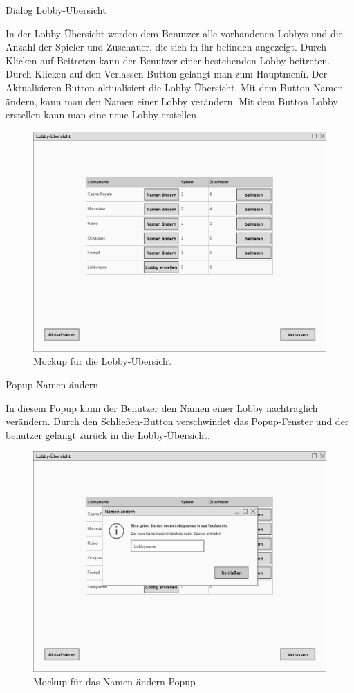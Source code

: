 Dialog \glqq{}Lobby-Übersicht\grqq{}

In der Lobby-Übersicht werden dem Benutzer alle vorhandenen Lobbys und die Anzahl der Spieler und Zuschauer, die sich in ihr befinden angezeigt. Durch Klicken auf Beitreten kann der Benutzer einer bestehenden Lobby beitreten. Durch Klicken auf den Verlassen-Button gelangt man zum Hauptmenü. Der Aktualisieren-Button aktualisiert die Lobby-Übersicht. Mit dem Button Namen ändern, kann man den Namen einer Lobby verändern. Mit dem Button Lobby erstellen kann man eine neue Lobby erstellen.

\begin{figure}
  \centering
  \includegraphics[width=\textwidth]{Meilenstein03/Lobby-Uebersicht_Mockup.png}
  \caption{Mockup für die Lobby-Übersicht}
\end{figure}

Popup \glqq{}Namen ändern\grqq{}

In diesem Popup kann der Benutzer den Namen einer Lobby nachträglich verändern. Durch den Schließen-Button verschwindet das Popup-Fenster und der benutzer gelangt zurück in die Lobby-Übersicht.

\begin{figure}
  \centering
  \includegraphics[width=\textwidth]{Meilenstein03/NamenAendern_Mockup.png}
  \caption{Mockup für das Namen ändern-Popup}
\end{figure}

